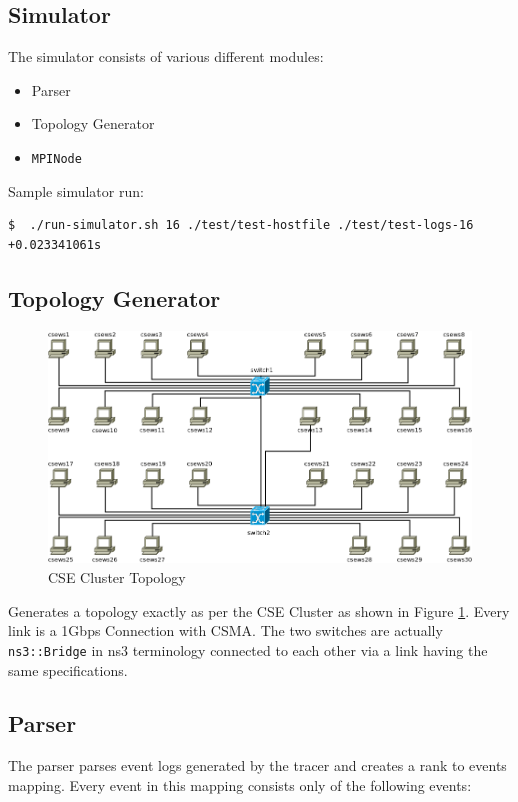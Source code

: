 \documentclass[10pt,conference]{IEEEtran}
\begin{document}
\subsection{Simulator}
The simulator consists of various different modules:
\begin{itemize}
  \item Parser
  \item Topology Generator
  \item \texttt{MPINode}
\end{itemize}

Sample simulator run:
\begin{lstlisting}[frame=single]
$  ./run-simulator.sh 16 ./test/test-hostfile ./test/test-logs-16
+0.023341061s
\end{lstlisting}

\subsection{Topology Generator}

\begin{figure}
  \includegraphics[width=\linewidth]{topology}
  \caption{ CSE Cluster Topology }
  \label{fig:1}
\end{figure}

Generates a topology exactly as per the CSE Cluster as shown in Figure
\ref{fig:1}. Every link is a 1Gbps Connection with CSMA. The two switches are
actually \texttt{ns3::Bridge} in ns3 terminology connected to each other via a
link having the same specifications.

\subsection{Parser}
The parser parses event logs generated by the tracer and creates a rank to events
mapping. Every event in this mapping consists only of the following events:
\end{document}
